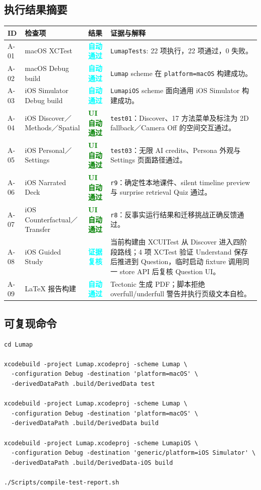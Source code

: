 \documentclass[10pt,a4paper,fontset=none]{ctexart}
\newcommand{\code}[1]{\begingroup\urlstyle{tt}\nolinkurl{#1}\endgroup}
\newcommand{\pill}[3]{\begingroup\setlength{\fboxsep}{3pt}\colorbox{#1}{\textcolor{#2}{\sffamily\bfseries\scriptsize #3}}\endgroup}
\newcommand{\UIPass}{\pill{GreenPale}{Green}{UI 自动通过}}
\newcommand{\AutoPass}{\pill{CyanPale}{Cyan}{自动通过}}
\newcommand{\EvidencePass}{\pill{CyanPale}{Cyan}{证据复核}}
\begin{document}
\subsection{执行结果摘要}
\begin{table}[htbp]
\centering
\small
\begin{tabularx}{\textwidth}{P{18mm}P{44mm}P{28mm}Y}
\toprule
ID & 检查项 & 结果 & 证据与解释 \\
\midrule
A-01 & macOS XCTest & \AutoPass & \code{LumapTests}: 22 项执行，22 项通过，0 失败。 \\
A-02 & macOS Debug build & \AutoPass & \code{Lumap} scheme 在 \code{platform=macOS} 构建成功。 \\
A-03 & iOS Simulator Debug build & \AutoPass & \code{LumapiOS} scheme 面向通用 iOS Simulator 构建成功。 \\
A-04 & iOS Discover／Methods／Spatial & \UIPass & \code{test01}：Discover、17 方法菜单及标注为 2D fallback／Camera Off 的空间交互通过。 \\
A-05 & iOS Personal／Settings & \UIPass & \code{test03}：无限 AI credits、Persona 外观与 Settings 页面路径通过。 \\
A-06 & iOS Narrated Deck & \UIPass & \code{r9}：确定性本地课件、silent timeline preview 与 surprise retrieval Quiz 通过。 \\
A-07 & iOS Counterfactual／Transfer & \UIPass & \code{r8}：反事实运行结果和迁移挑战正确反馈通过。 \\
A-08 & iOS Guided Study & \EvidencePass & 当前构建由 XCUITest 从 Discover 进入四阶段路线；4 项 XCTest 验证 Understand 保存后推进到 Question，临时启动 fixture 调用同一 store API 后复核 Question UI。 \\
A-09 & LaTeX 报告构建 & \AutoPass & Tectonic 生成 PDF；脚本拒绝 overfull/underfull 警告并执行页级文本自检。 \\
\bottomrule
\end{tabularx}
\end{table}

\noindent\begin{minipage}{\textwidth}
\subsection{可复现命令}
\begin{verbatim}
cd Lumap

xcodebuild -project Lumap.xcodeproj -scheme Lumap \
  -configuration Debug -destination 'platform=macOS' \
  -derivedDataPath .build/DerivedData test

xcodebuild -project Lumap.xcodeproj -scheme Lumap \
  -configuration Debug -destination 'platform=macOS' \
  -derivedDataPath .build/DerivedData build

xcodebuild -project Lumap.xcodeproj -scheme LumapiOS \
  -configuration Debug -destination 'generic/platform=iOS Simulator' \
  -derivedDataPath .build/DerivedData-iOS build

./Scripts/compile-test-report.sh
\end{verbatim}
\end{minipage}
\end{document}
